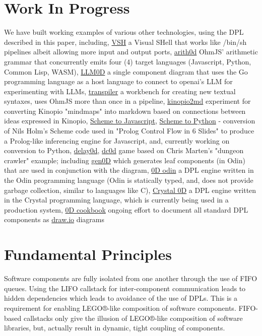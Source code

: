 \documentclass[10pt,anonymous,review]{acmart}
\begin{document}
\section{Work In Progress}
We have built working examples of various other technologies, using the
DPL described in this paper, including,
\underline{VSH}\cite{vsh} a Visual SHell that works like /bin/sh pipelines albeit allowing more input and output ports,
\underline{arith0d}\cite{arith0d} OhmJS' arithmetic grammar that concurrently emits four (4) target languages (Javascript, Python, Common Lisp, WASM),
\underline{LLM0D}\cite{llm0d} a single component diagram that uses the Go programming language as a host language to connect to openai's LLM for experimenting with LLMs,
\underline{transpiler}\cite{transpiler} a workbench for creating new textual syntaxes, uses OhmJS more than once in a pipeline,
\underline{kinopio2md}\cite{k2m} experiment for converting Kinopio "mindmaps" into markdown based on connections between ideas expressed in Kinopio,
\underline{Scheme to Javascript}\cite{scm2js}, \underline{Scheme to Python}\cite{scm2py} - conversion of Nils Holm's Scheme code used in "Prolog Control Flow in 6 Slides"\cite{holm} to produce a Prolog-like inferencing engine for Javascript, and, currently working on conversion to Python,
\underline{delay0d}\cite{delay0d},
\underline{dc0d}\cite{dc0d} game based on Chris Marten's "dungeon crawler" example\cite{ceptre_paper}; including \underline{gen0D} which generates leaf components (in Odin) that are used in conjunction with the diagram,
\underline{0D odin}\cite{odin0d} a DPL engine written in the Odin programming language (Odin is statically typed, and, does not provide garbage collection, similar to languages like C),
\underline{Crystal 0D}\cite{crystal0d} a DPL engine written in the Crystal programming language, which is currently being used in a production system,
\underline{0D cookbook}\cite{0dcookbook} ongoing effort to document all standard DPL components as \href{http://draw.io}{draw.io} diagrams

\section{Fundamental Principles}
Software components are fully isolated from one another through the use
of FIFO queues. Using the LIFO callstack for inter-component
communication leads to hidden dependencies which leads to avoidance of the use of
DPLs. This is a requirement for enabling LEGO®-like composition of software components.
FIFO-based callstacks only give the illusion of LEGO®-like composition of software libraries,
but, actually result in dynamic, tight coupling of components.
\end{document}
